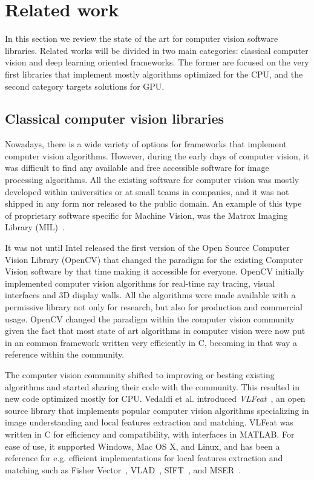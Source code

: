 
\section{Related work}
\label{section:related_work}
In this section we  review  the state of the art for computer vision software libraries. Related works will be divided in two main categories: classical computer vision and deep learning oriented  frameworks. The former are focused on  the very first libraries that implement mostly algorithms optimized for the CPU, and the second category targets solutions for GPU.

\subsection{Classical computer vision libraries}
\label{section:related_work:traditional_vision}
Nowadays, there is a wide variety of options for frameworks that implement computer vision algorithms. However, during the early days of computer vision, it was difficult to find any available and free accessible software for image processing algorithms. All the existing software for computer vision was mostly developed within universities or at small teams in companies, and it was not shipped in any form nor released to the public domain. An example of this type of proprietary software specific for Machine Vision, was the Matrox Imaging Library (MIL)~\citep{matrox_imaging}.

It was not until Intel released the first version of the Open Source Computer Vision Library (OpenCV) that changed the paradigm for the existing Computer Vision software by that time making it accessible for everyone. OpenCV \citep{opencv} initially implemented computer vision algorithms for real-time ray tracing, visual interfaces and 3D display walls. All the algorithms were made available with a permissive library not only for research, but also for production and commercial usage. OpenCV changed the paradigm within the computer vision community given the fact that most   state of art algorithms in computer vision were now put in an common framework written very efficiently in C, becoming in that way a reference within the community.

The computer vision community shifted to improving or besting existing algorithms and started sharing their code with the community. This resulted in new code optimized mostly for CPU. Vedaldi et al. introduced \textit{VLFeat}~\citep{vedaldi08vlfeat}, an open source library that implements popular computer vision algorithms specializing in image understanding and local features extraction and matching. VLFeat was written in C for efficiency and compatibility, with interfaces in MATLAB. For ease of use, it supported Windows, Mac OS X, and Linux, and has been a reference for e.g. efficient implementations for local features extraction and matching such as Fisher Vector~\citep{Sanchez2013}, VLAD~\citep{VLAD2010}, SIFT~\citep{Lowe2004}, and MSER~\citep{Matas2002}.

